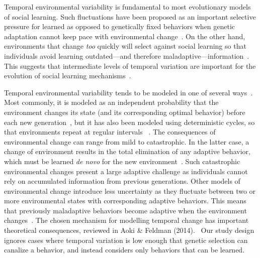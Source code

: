 \documentclass[letterpaper,11.5pt]{scrartcl}
\begin{document}
Temporal environmental variability is fundamental to most evolutionary models of
social learning. Such fluctuations have been proposed as an important selective
pressure for learned as opposed to genetically fixed behaviors when genetic adaptation cannot keep pace with environmental change~\citep{Richerson2000}. On the other hand, environments that change \emph{too} quickly will select against social learning so that individuals avoid learning outdated---and therefore maladaptive---information~\citep{Feldman1996,
BoydRicherson1985}. This suggests that intermediate levels of temporal variation
are important for the evolution of social learning mechanisms~\citep{aoki2005}.

Temporal environmental variability tends to be modeled in one of 
several ways~\citep{aoki2014evolution}. Most commonly, it is modeled
as an independent probability that the environment changes its state (and its corresponding optimal behavior) before each new generation~\citep{BoydRicherson1985,Rogers1988,Feldman1996,McElreath2005,Enquist2007,perreault2012bayesian,aoki2014evolution}, but
it has also been modeled using deterministic cycles, so that environments repeat at regular intervals ~\citep{Feldman1996, aoki2014evolution}.
The consequences of environmental change can range from mild to catastrophic. In the latter case, a change of environment results in the total elimination of any adaptive behavior, which must be learned \emph{de novo} for the new environment~\citep{Rogers1988}. Such catastrophic environmental changes present
a large adaptive challenge as individuals cannot rely on accumulated information
from previous generations. Other models of environmental change introduce less
uncertainty as they fluctuate between two or more environmental states with corresponding adaptive behaviors. This means that previously maladaptive
behaviors become adaptive when the environment changes~\citep{perreault2012bayesian}. The chosen mechanism for modelling temporal change has important theoretical consequences, reviewed in Aoki \& Feldman (2014).~\nocite{aoki2014evolution} Our study design ignores cases where temporal variation is low enough that genetic selection can canalize a behavior, and instead considers only behaviors that can be learned. 
\end{document}
